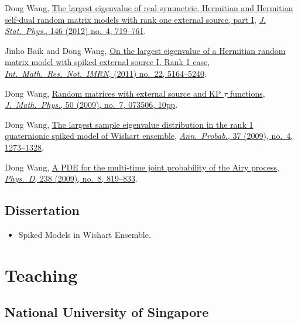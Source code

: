 \documentclass[12pt,a4paper]{article}
\begin{document}
\begin{etaremune}
\item Dong Wang,
  \href{http://arxiv.org/abs/1012.4144}{The largest eigenvalue of real symmetric, Hermitian and Hermitian self-dual random matrix models with rank one external source, part I}, \href{https://doi.org/10.1007/s10955-012-0417-x}{\textit{J. Stat.\ Phys.}, 146 (2012) no.\ 4, 719--761}.
\item Jinho Baik and  Dong Wang,
  \href{http://arxiv.org/abs/1010.4604}{On the largest eigenvalue of a Hermitian random matrix model with spiked external source I. Rank 1 case}, \href{https://doi.org/10.1093/imrn/rnq257}{\textit{Int.\ Math.\ Res.\ Not.\ IMRN}, (2011) no.\ 22, 5164--5240}.
\item Dong Wang,
  \href{http://arxiv.org/abs/0810.0280}{Random matrices with external source and KP $\tau$ functions}, \href{https://doi.org/10.1063/1.3167802}{\textit{J.\ Math.\ Phys.}, 50 (2009), no.\ 7, 073506, 10pp}.
\item Dong Wang,
 \href{http://arxiv.org/abs/0711.2722}{The largest sample eigenvalue distribution in the rank 1 quaternionic spiked model of Wishart ensemble}, \href{https://doi.org/10.1214/08-AOP432}{\textit{Ann.\ Probab.}, 37 (2009), no.\ 4, 1273--1328}.
\item Dong Wang,
  \href{http://arxiv.org/abs/0711.3797}{A PDE for the multi-time joint probability of the Airy process}, \href{https://doi.org/10.1016/j.physd.2009.02.007}{\textit{Phys.\ D}, 238 (2009), no.\ 8, 819--833}.
\end{etaremune}

\subsection*{Dissertation}
\begin{itemize}
\item
  Spiked Models in Wishart Ensemble.
\end{itemize}

\section*{Teaching}

\subsection*{{National University of Singapore}}
\end{document}
